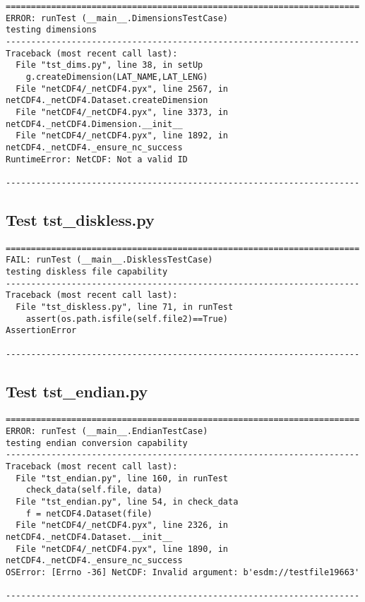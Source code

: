 \begin{verbatim}
======================================================================
ERROR: runTest (__main__.DimensionsTestCase)
testing dimensions
----------------------------------------------------------------------
Traceback (most recent call last):
  File "tst_dims.py", line 38, in setUp
    g.createDimension(LAT_NAME,LAT_LENG)
  File "netCDF4/_netCDF4.pyx", line 2567, in netCDF4._netCDF4.Dataset.createDimension
  File "netCDF4/_netCDF4.pyx", line 3373, in netCDF4._netCDF4.Dimension.__init__
  File "netCDF4/_netCDF4.pyx", line 1892, in netCDF4._netCDF4._ensure_nc_success
RuntimeError: NetCDF: Not a valid ID

----------------------------------------------------------------------
\end{verbatim}

\subsection{Test tst\_diskless.py}

\begin{verbatim}
======================================================================
FAIL: runTest (__main__.DisklessTestCase)
testing diskless file capability
----------------------------------------------------------------------
Traceback (most recent call last):
  File "tst_diskless.py", line 71, in runTest
    assert(os.path.isfile(self.file2)==True)
AssertionError

----------------------------------------------------------------------
\end{verbatim}

\subsection{Test tst\_endian.py}

\begin{verbatim}
======================================================================
ERROR: runTest (__main__.EndianTestCase)
testing endian conversion capability
----------------------------------------------------------------------
Traceback (most recent call last):
  File "tst_endian.py", line 160, in runTest
    check_data(self.file, data)
  File "tst_endian.py", line 54, in check_data
    f = netCDF4.Dataset(file)
  File "netCDF4/_netCDF4.pyx", line 2326, in netCDF4._netCDF4.Dataset.__init__
  File "netCDF4/_netCDF4.pyx", line 1890, in netCDF4._netCDF4._ensure_nc_success
OSError: [Errno -36] NetCDF: Invalid argument: b'esdm://testfile19663'

----------------------------------------------------------------------
\end{verbatim}

